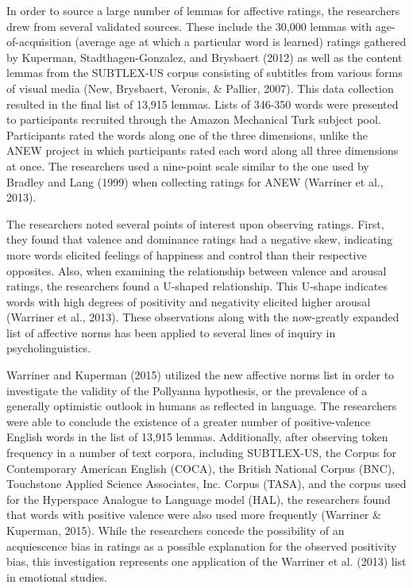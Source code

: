 \documentclass[,man]{apa6}
\begin{document}
In order to source a large number of lemmas for affective ratings, the
researchers drew from several validated sources. These include the
30,000 lemmas with age-of-acquisition (average age at which a particular
word is learned) ratings gathered by Kuperman, Stadthagen-Gonzalez, and
Brysbaert (2012) as well as the content lemmas from the SUBTLEX-US
corpus consisting of subtitles from various forms of visual media (New,
Brysbaert, Veronis, \& Pallier, 2007). This data collection resulted in
the final list of 13,915 lemmas. Lists of 346-350 words were presented
to participants recruited through the Amazon Mechanical Turk subject
pool. Participants rated the words along one of the three dimensions,
unlike the ANEW project in which participants rated each word along all
three dimensions at once. The researchers used a nine-point scale
similar to the one used by Bradley and Lang (1999) when collecting
ratings for ANEW (Warriner et al., 2013).

The researchers noted several points of interest upon observing ratings.
First, they found that valence and dominance ratings had a negative
skew, indicating more words elicited feelings of happiness and control
than their respective opposites. Also, when examining the relationship
between valence and arousal ratings, the researchers found a U-shaped
relationship. This U-shape indicates words with high degrees of
positivity and negativity elicited higher arousal (Warriner et al.,
2013). These observations along with the now-greatly expanded list of
affective norms has been applied to several lines of inquiry in
psycholinguistics.

Warriner and Kuperman (2015) utilized the new affective norms list in
order to investigate the validity of the Pollyanna hypothesis, or the
prevalence of a generally optimistic outlook in humans as reflected in
language. The researchers were able to conclude the existence of a
greater number of positive-valence English words in the list of 13,915
lemmas. Additionally, after observing token frequency in a number of
text corpora, including SUBTLEX-US, the Corpus for Contemporary American
English (COCA), the British National Corpus (BNC), Touchstone Applied
Science Associates, Inc. Corpus (TASA), and the corpus used for the
Hyperspace Analogue to Language model (HAL), the researchers found that
words with positive valence were also used more frequently (Warriner \&
Kuperman, 2015). While the researchers concede the possibility of an
acquiescence bias in ratings as a possible explanation for the observed
positivity bias, this investigation represents one application of the
Warriner et al. (2013) list in emotional studies.
\end{document}
